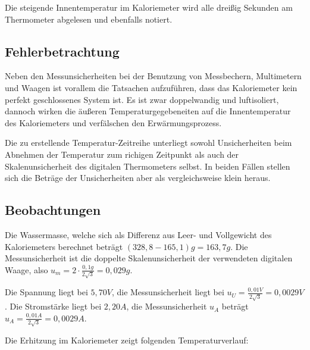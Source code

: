 \documentclass[
  9pt,
]{article}
\begin{document}
Die steigende Innentemperatur im Kaloriemeter wird alle dreißig Sekunden
am Thermometer abgelesen und ebenfalls notiert.

\hypertarget{fehlerbetrachtung}{%
\subsection{Fehlerbetrachtung}\label{fehlerbetrachtung}}

Neben den Messunsicherheiten bei der Benutzung von Messbechern,
Multimetern und Waagen ist vorallem die Tatsachen aufzuführen, dass das
Kaloriemeter kein perfekt geschlossenes System ist. Es ist zwar
doppelwandig und luftisoliert, dannoch wirken die äußeren
Temperaturgegebeneiten auf die Innentemperatur des Kaloriemeters und
verfälschen den Erwärmungsprozess.

Die zu erstellende Temperatur-Zeitreihe unterliegt sowohl Unsicherheiten
beim Abnehmen der Temperatur zum richigen Zeitpunkt als auch der
Skalenunsicherheit des digitalen Thermometers selbst. In beiden Fällen
stellen sich die Beträge der Unsicherheiten aber als vergleichsweise
klein heraus.

\hypertarget{beobachtungen}{%
\subsection{Beobachtungen}\label{beobachtungen}}

Die Wassermasse, welche sich als Differenz aus Leer- und Vollgewicht des
Kaloriemeters berechnet beträgt \((328,8-165,1)g=163,7g\). Die
Messunsicherheit ist die doppelte Skalenunsicherheit der verwendeten
digitalen Waage, also \(u_m=2\cdot \frac{0,1g}{2\sqrt{3}} = 0,029g\).

Die Spannung liegt bei \(5,70V\), die Messunsicherheit liegt bei
\(u_U=\frac{0,01V}{2\sqrt{3}}=0,0029V\). Die Stromstärke liegt bei
\(2,20A\), die Messunsicherheit \(u_A\) beträgt
\(u_A=\frac{0,01A}{2\sqrt{3}}=0,0029A\).

Die Erhitzung im Kaloriemeter zeigt folgenden Temperaturverlauf:
\end{document}
